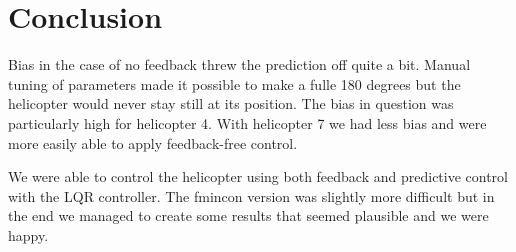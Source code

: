 \section{Conclusion}\label{sec:conclusion}
Bias in the case of no feedback threw the prediction off quite a bit. Manual tuning of parameters made it possible to make a fulle 180 degrees but the helicopter would never stay still at its position. The bias in question was particularly high for helicopter 4. With helicopter 7 we had less bias and were more easily able to apply feedback-free control.

We were able to control the helicopter using both feedback and predictive control with the LQR controller. The fmincon version was slightly more difficult but in the end we managed to create some results that seemed plausible and we were happy.

